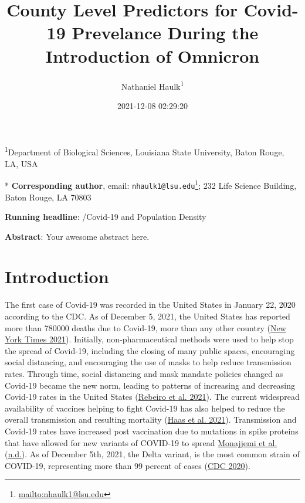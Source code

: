 \documentclass[
  12pt,
]{article}
\title{County Level Predictors for Covid-19 Prevelance During the Introduction of Omnicron}
\author{Nathaniel Haulk\textsuperscript{1}}
\date{2021-12-08 02:29:20}
\DeclareRobustCommand{\href}[2]{#2\footnote{\url{#1}}}
\begin{document}
\maketitle

\renewcommand{\figurename}{{\textbf{Figure}}}
\renewcommand{\tablename}{{\textbf{Table}}}

\footnotesize

\textsuperscript{1}Department of Biological Sciences, Louisiana State University, Baton Rouge, LA, USA

* \textbf{Corresponding author}, email: \href{mailto:nhaulk1@lsu.edu}{\nolinkurl{nhaulk1@lsu.edu}}; 232 Life Science Building, Baton Rouge, LA 70803

\normalsize

\textbf{Running headline}: /Covid-19 and Population Density

\textbf{Abstract}: Your awesome abstract here.

\clearpage

\hypertarget{introduction}{%
\section{Introduction}\label{introduction}}

The first case of Covid-19 was recorded in the United States in January 22, 2020 according to the CDC. As of December 5, 2021, the United States has reported more than 780000 deaths due to Covid-19, more than any other country (\protect\hyperlink{ref-new_york_times_coronavirus_2021}{New York Times 2021}). Initially, non-pharmaceutical methods were used to help stop the spread of Covid-19, including the closing of many public spaces, encouraging social distancing, and encouraging the use of masks to help reduce transmission rates. Through time, social distancing and mask mandate policies changed as Covid-19 became the new norm, leading to patterns of increasing and decreasing Covid-19 rates in the United States (\protect\hyperlink{ref-rebeiro_impact_2021}{Rebeiro et al. 2021}). The current widespread availability of vaccines helping to fight Covid-19 has also helped to reduce the overall transmission and resulting mortality (\protect\hyperlink{ref-haas_infections_2021}{Haas et al. 2021}). Transmission and Covid-19 rates have increased post vaccination due to mutations in spike proteins that have allowed for new variants of COVID-19 to spread \protect\hyperlink{ref-monajjemi_delta_nodate}{Monajjemi et al.} (\protect\hyperlink{ref-monajjemi_delta_nodate}{n.d.}). As of December 5th, 2021, the Delta variant, is the most common strain of COVID-19, representing more than 99 percent of cases (\protect\hyperlink{ref-cdc_covid_2020}{CDC 2020}).
\end{document}
